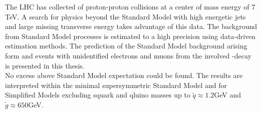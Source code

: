 The LHC has collected \lumi of proton-proton collisions at a center of mass energy of 7 TeV. A search for physics beyond the Standard Model with high energetic jets and large missing transverse energy takes advantage of this data. The background from Standard Model processes is estimated to a high precision using data-driven estimation methods. The prediction of the Standard Model background arising form \ttbar and \wpj events with unidentified electrons and muons from the involved \W-decay is presented in this thesis.\\
No excess above Standard Model expectation could be found. The results are interpreted within the minimal supersymmetric Standard Model and for Simplified Models excluding squark and qluino masses up to $\tilde q \approx 1.2$GeV and $\tilde g \approx 650$GeV. 